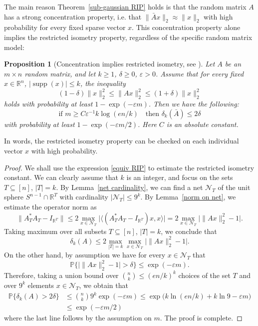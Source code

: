 \documentclass[10pt, openany]{book}
\newtheorem{proposition}[theorem]{Proposition}
\theoremstyle{remark}
\DeclareMathOperator{\supp}{supp}
\def \R {\mathbb{R}}
\def \P {\mathbb{P}}
\def \NN {\mathcal{N}}
\def \e {\varepsilon}
\def \d {\delta}
\begin{document}
The main reason Theorem~\ref{sub-gaussian RIP} holds is that the random matrix $A$ 
has a strong concentration property, i.e. that $\|\bar{A}x\|_2 \approx \|x\|_2$ with high 
probability for every fixed sparse vector $x$. This concentration property alone implies
the restricted isometry property, regardless of the specific random matrix model:

\begin{proposition}[Concentration implies restricted isometry, see \cite{BDDW}]		\label{concentration RIP}
  Let $A$ be an $m \times n$ random matrix, and let $k \ge 1$, $\d \ge 0$, $\e > 0$.
  Assume that for every fixed $x \in \R^n$, $|\supp(x)| \le k$, the inequality
  $$
  (1-\d) \|x\|_2^2 \le \|Ax\|_2^2 \le (1+\d) \|x\|_2^2
  $$
  holds with probability at least $1 - \exp(-\e m)$.
  Then we have the following: 
  $$
  \text{if } m \ge C \e^{-1} k \log (en/k)
  \quad \text{then } \d_k(\bar{A}) \le 2\d
  $$
  with probability at least $1 - \exp(-\e m / 2)$. Here $C$ is an absolute constant.
\end{proposition}

In words, the restricted isometry property can be checked on each individual 
vector $x$ with high probability. 

\begin{proof}
We shall use the expression \eqref{equiv RIP} to estimate the restricted isometry constant.
We can clearly assume that $k$ is an integer, and focus on the sets 
$T \subseteq [n]$, $|T| = k$. 
By Lemma~\ref{net cardinality}, we can find a net $\NN_T$ of the unit sphere $S^{n-1} \cap \R^T$
with cardinality $|\NN_T| \le 9^k$. 
By Lemma~\ref{norm on net}, we estimate the operator norm as 
$$
\big\| A_T^* A_T - I_{\R^T} \big\|
\le 2 \max_{x \in \NN_T} \big| \big\langle (A_T^* A_T - I_{\R^T})x, x \big\rangle \big|
= 2 \max_{x \in \NN_T} \big| \|Ax\|_2^2 - 1 \big|.
$$
Taking maximum over all subsets $T \subseteq [n]$, $|T| = k$, we conclude that 
$$
\d_k(A) \le 2 \max_{|T| = k} \max_{x \in \NN_T} \big| \|Ax\|_2^2 - 1 \big|.
$$ 
On the other hand, by assumption we have for every $x \in \NN_T$ that 
$$
\P \big\{ \big| \|Ax\|_2^2 - 1 \big| > \d \big\} 
\le \exp(-\e m).
$$
Therefore, taking a union bound over $\binom{n}{k} \le (en/k)^k$ choices of the set $T$ 
and over $9^k$ elements $x \in \NN_T$, we obtain that
\begin{align*}
\P \{ \d_k(A) > 2\d \} 
&\le \binom{n}{k} 9^k \exp(-\e m)
\le \exp \big( k \ln(en/k) + k \ln 9 - \e m \big) \\
&\le \exp(- \e m / 2) 
\end{align*}
where the last line follows by the assumption on $m$. 
The proof is complete.
\end{proof}
\end{document}
